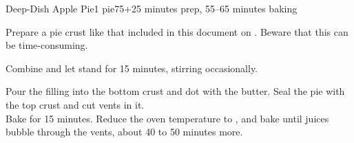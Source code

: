 \documentclass[../Cookbook.tex]{subfiles}
\begin{document}
\begin{recipe}{Deep-Dish Apple Pie}{1 pie}{75+25 minutes prep, 55--65 minutes baking}

	Prepare a pie crust like that included in this document on . Beware that this can be time-consuming.

	\newstep

	Combine and let stand for 15 minutes, stirring occasionally.

	Pour the filling into the bottom crust and dot with the butter. Seal the pie with the top crust and cut vents in it.\\
	Bake for 15 minutes.
	Reduce the oven temperature to , and bake until juices bubble through the vents, about 40 to 50 minutes more.

\end{recipe}
\end{document}
